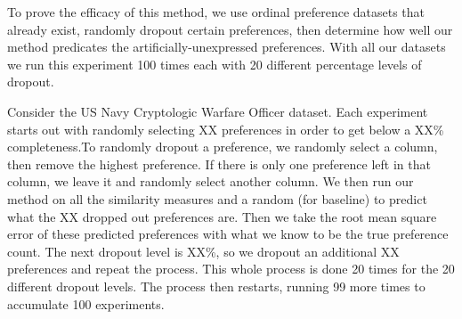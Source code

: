 To prove the efficacy of this method, we use ordinal preference datasets that already exist, randomly dropout certain preferences, then determine how well our method predicates the artificially-unexpressed preferences. With all our datasets we run this experiment 100 times each with 20 different percentage levels of dropout. 

Consider the US Navy Cryptologic Warfare Officer dataset. Each experiment starts out with randomly selecting XX preferences in order to get below a XX\% completeness.To randomly dropout a preference, we randomly select a column, then remove the highest preference. If there is only one preference left in that column, we leave it and randomly select another column. 
We then run our method on all the similarity measures and a random (for baseline) to predict what the XX dropped out preferences are. Then we take the root mean square error of these predicted preferences with what we know to be the true preference count. 
The next dropout level is XX\%, so we dropout an additional XX preferences and repeat the process. 
This whole process is done 20 times for the 20 different dropout levels. The process then restarts, running 99 more times to accumulate 100 experiments. 